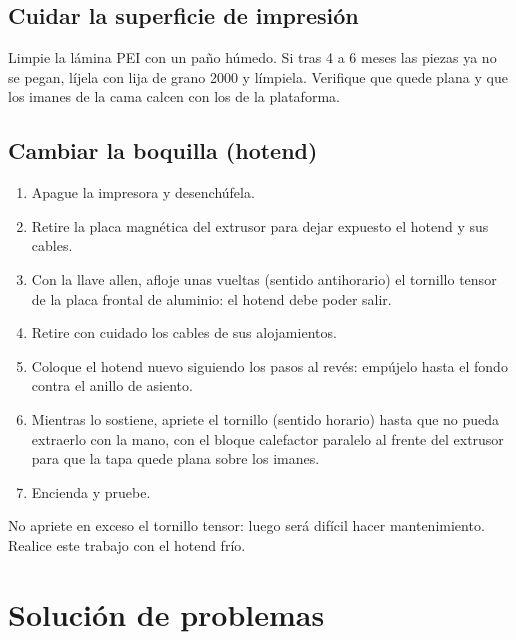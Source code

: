 \subsection{Cuidar la superficie de impresión}

Limpie la lámina PEI con un paño húmedo. Si tras 4 a 6 meses las piezas ya no se pegan, líjela con lija de grano 2000 y límpiela. Verifique que quede plana y que los imanes de la cama calcen con los de la plataforma.

\subsection{Cambiar la boquilla (hotend)}

\begin{enumerate}
    \item Apague la impresora y desenchúfela.
    \item Retire la placa magnética del extrusor para dejar expuesto el hotend y sus cables.
    \item Con la llave allen, afloje unas vueltas (sentido antihorario) el tornillo tensor de la placa frontal de aluminio: el hotend debe poder salir.
    \item Retire con cuidado los cables de sus alojamientos.
    \item Coloque el hotend nuevo siguiendo los pasos al revés: empújelo hasta el fondo contra el anillo de asiento.
    \item Mientras lo sostiene, apriete el tornillo (sentido horario) hasta que no pueda extraerlo con la mano, con el bloque calefactor paralelo al frente del extrusor para que la tapa quede plana sobre los imanes.
    \item Encienda y pruebe.
\end{enumerate}

\begin{warningbox}
No apriete en exceso el tornillo tensor: luego será difícil hacer mantenimiento. Realice este trabajo con el hotend frío.
\end{warningbox}

\section{Solución de problemas}

